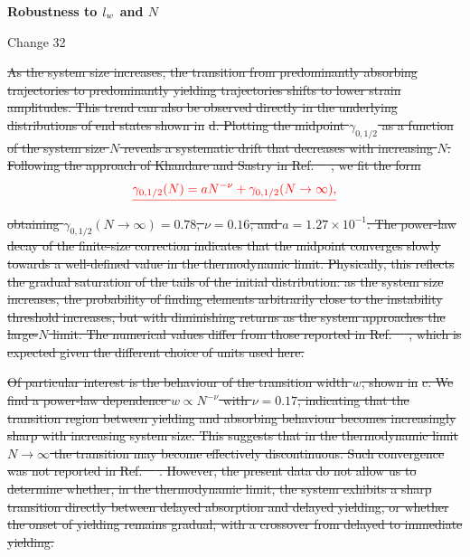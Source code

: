 \documentclass[asymmetricmargins]{library/duthesis}%
\newcommand{\DiffReportBodyFont}{\small}
\newcommand{\DiffReportLocationFont}{\large\bfseries}
\newcommand{\DiffReportMetaFont}{\small\ttfamily}
\newcommand{\DiffReportLocation}[1]{%
  \Needspace{4\baselineskip}%
  \par\medskip
  {\DiffReportLocationFont #1\par}
}
\newcommand{\DiffReportChange}[1]{%
  \Needspace{4\baselineskip}%
  \par\smallskip
  {\DiffReportMetaFont Change #1\par}
  \smallskip
}
\newenvironment{DiffReportContent}
  {\begingroup\DiffReportBodyFont}
  {\par\endgroup\medskip}
\providecommand{\DIFdel}[1]{{\protect\color{red}\sout{#1}}}                      %
\providecommand{\DIFdelbegin}{} %
\begin{document}
\DiffReportLocation{Robustness to \texorpdfstring{$l_w$ and $N$}{lw and N}}
\DiffReportChange{32}
\begin{DiffReportContent}
\DIFdelbegin \DIFdel{As the system size increases, the transition from predominantly absorbing trajectories to predominantly yielding trajectories shifts to lower strain amplitudes. This trend can also be observed directly in the underlying distributions of end states shown in }%
\DIFdel{d. Plotting the midpoint $\gamma_{0,1/2}$ as a function of the system size $N$ reveals a systematic drift that decreases with increasing $N$. Following the approach of Khandare and Sastry in Ref.~\mbox{%
\cite{khandareElastoplasticModellingCyclic2026}}\hskip0pt%
, we fit the form
}\[
    \DIFdel{\gamma_{0,1/2}(N)=aN^{-\nu}+\gamma_{0,1/2}(N\to\infty),
}\]%
\DIFdel{obtaining $\gamma_{0,1/2}(N\to\infty)=0.78$, $\nu=0.16$, and $a=1.27\times10^{-1}$. The power-law decay of the finite-size correction indicates that the midpoint converges slowly towards a well-defined value in the thermodynamic limit. Physically, this reflects the gradual saturation of the tails of the initial distribution: as the system size increases, the probability of finding elements arbitrarily close to the instability threshold increases, but with diminishing returns as the system approaches the large-$N$ limit. The numerical values differ from those reported in Ref.~\mbox{%
\cite{khandareElastoplasticModellingCyclic2026}}\hskip0pt%
, which is expected given the different choice of units used here.
}%

\DIFdel{Of particular interest is the behaviour of the transition width $w$, shown in }%
\DIFdel{c. We find a power-law dependence $w\propto N^{-\nu}$ with $\nu=0.17$, indicating that the transition region between yielding and absorbing behaviour becomes increasingly sharp with increasing system size. This suggests that in the thermodynamic limit $N\to\infty$ the transition may become effectively discontinuous. Such convergence was not reported in Ref.~\mbox{%
\cite{khandareElastoplasticModellingCyclic2026}}\hskip0pt%
. However, the present data do not allow us to determine whether, in the thermodynamic limit, the system exhibits a sharp transition directly between delayed absorption and delayed yielding, or whether the onset of yielding remains gradual, with a crossover from delayed to immediate yielding.
}%


\end{DiffReportContent}
\end{document}

